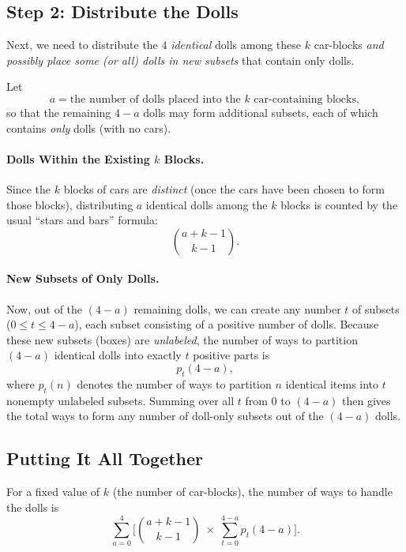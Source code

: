 \documentclass[docmute]{article}
\begin{document}
\begin{enumerate}
    \subsection*{Step 2: Distribute the Dolls}
    
    Next, we need to distribute the \(4\) \emph{identical} dolls among these \(k\) car-blocks \emph{and possibly place some (or all) dolls in new subsets} that contain only dolls. 
    
    Let
    \[
    a = \text{the number of dolls placed into the }k\text{ car-containing blocks},
    \]
    so that the remaining \(4-a\) dolls may form additional subsets, each of which contains \emph{only} dolls (with no cars).
    
    \paragraph{Dolls Within the Existing \(k\) Blocks.}
    
    Since the \(k\) blocks of cars are \emph{distinct} (once the cars have been chosen to form those blocks), distributing \(a\) identical dolls among the \(k\) blocks is counted by the usual ``stars and bars'' formula:
    \[
    \binom{a + k - 1}{k - 1}.
    \]
    
    \paragraph{New Subsets of Only Dolls.}
    
    Now, out of the \((4 - a)\) remaining dolls, we can create any number \(t\) of subsets (\(0 \le t \le 4-a\)), each subset consisting of a positive number of dolls.  Because these new subsets (boxes) are \emph{unlabeled}, the number of ways to partition \((4 - a)\) identical dolls into exactly \(t\) positive parts is
    \[
    p_t(4 - a),
    \]
    where \(p_t(n)\) denotes the number of ways to partition \(n\) identical items into \(t\) nonempty unlabeled subsets. Summing over all \(t\) from \(0\) to \((4-a)\) then gives the total ways to form any number of doll-only subsets out of the \((4 - a)\) dolls.
    
    \subsection*{Putting It All Together}
    
    For a fixed value of \(k\) (the number of car-blocks), the number of ways to handle the dolls is
    \[
    \sum_{a=0}^{4}
    \Biggl[
      \binom{a + k - 1}{k - 1}
      \;\times\;
      \sum_{t=0}^{4 - a} p_{t}(4 - a)
    \Biggr].
    \]
    

\end{enumerate}
\end{document}
